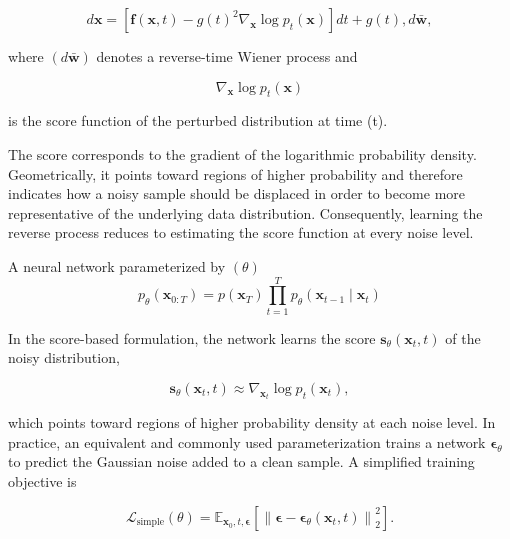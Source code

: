 \begin{equation}
d\mathbf{x}
=
\left[
\mathbf{f}(\mathbf{x},t)
-
g(t)^2
\nabla_{\mathbf{x}}
\log p_t(\mathbf{x})
\right]dt
+
g(t),d\bar{\mathbf{w}},
\end{equation}

where $(d\bar{\mathbf{w}})$ denotes a reverse-time Wiener process and

\begin{equation}
\nabla_{\mathbf{x}}
\log p_t(\mathbf{x})
\end{equation}

is the score function of the perturbed distribution at time (t).

The score corresponds to the gradient of the logarithmic probability density. Geometrically, it points toward regions of higher probability and therefore indicates how a noisy sample should be displaced in order to become more representative of the underlying data distribution. Consequently, learning the reverse process reduces to estimating the score function at every noise level.

A neural network parameterized by $(\theta)$
\begin{equation}
    p_{\theta}(\mathbf{x}_{0:T})
    =
    p(\mathbf{x}_T)
    \prod_{t=1}^{T}
    p_{\theta}(\mathbf{x}_{t-1}\mid\mathbf{x}_t)
\end{equation}

In the score-based formulation, the network learns the score $\mathbf{s}_{\theta}(\mathbf{x}_t,t)$ of the noisy
distribution,

\begin{equation}
    \mathbf{s}_{\theta}(\mathbf{x}_t,t)
    \approx
    \nabla_{\mathbf{x}_t}\log p_t(\mathbf{x}_t),
\end{equation}

which points toward regions of higher probability density at each noise level.
In practice, an equivalent and commonly used parameterization trains a network
$\boldsymbol{\epsilon}_{\theta}$ to predict the Gaussian noise added to a clean
sample. A simplified training objective is

\begin{equation}
    \mathcal{L}_{\mathrm{simple}}(\theta)
    =
    \mathbb{E}_{\mathbf{x}_0,t,\boldsymbol{\epsilon}}
    \left[
        \left\|
        \boldsymbol{\epsilon}
        -
        \boldsymbol{\epsilon}_{\theta}(\mathbf{x}_t,t)
        \right\|_2^2
    \right].
\end{equation}


